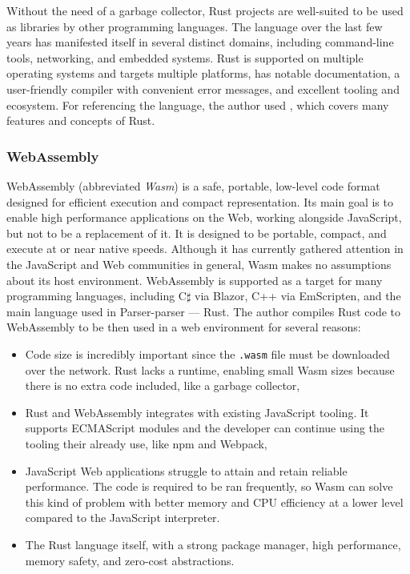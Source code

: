 \documentclass[english,bachelors,forcepolishlogotype]{wizthesis}
\newcommand{\paraphrase}[1]{#1}
\newcommand{\thisproject}{Parser-parser}
\begin{document}
Without the need of a garbage collector, Rust projects are well-suited to be
used as libraries by other programming languages. The language over the last few
years has manifested itself in several distinct domains, including command-line
tools, networking, and embedded systems. Rust is supported on multiple operating
systems and targets multiple platforms, has notable documentation, a
user-friendly compiler with convenient error messages, and excellent tooling and
ecosystem. For referencing the language, the author used \cite{klabnik-2018},
which covers many features and concepts of Rust.

\subsubsection*{WebAssembly}

WebAssembly \cite{webassembly} (abbreviated \emph{Wasm}) is a safe, portable,
low-level code format designed for efficient execution and compact
representation. Its main goal is to enable high performance applications on the
Web, working alongside JavaScript, but not to be a replacement of it.
\paraphrase{It is designed to be portable, compact, and execute at or near
native speeds. Although it has currently gathered attention in the JavaScript
and Web communities in general, Wasm makes no assumptions about its host
environment.} WebAssembly is supported as a target for many programming
languages, including C$\sharp$ via Blazor, C++ via EmScripten, and the main
language used in \thisproject{} --- Rust. The author compiles Rust code to
WebAssembly to be then used in a web environment for several reasons:
\begin{itemize}
  \item \paraphrase{Code size is incredibly important since the \texttt{.wasm}
  file must be downloaded over the network. Rust lacks a runtime, enabling small
  Wasm sizes because there is no extra code included, like a garbage collector},
  \item \paraphrase{Rust and WebAssembly integrates with existing JavaScript
  tooling. It supports ECMAScript modules and the developer can continue using
  the tooling their already use, like npm and Webpack},
  \item \paraphrase{JavaScript Web applications struggle to attain and retain
  reliable performance.} The code is required to be ran frequently, so Wasm can
  solve this kind of problem \paraphrase{with better memory and CPU efficiency
  at a lower level compared to the JavaScript interpreter}.
  \item The Rust language itself, with a strong package manager, high
  performance, memory safety, and zero-cost abstractions.
\end{itemize}
\end{document}
